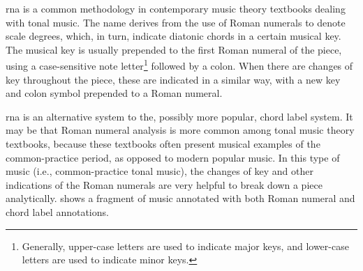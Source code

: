 

\gls{rna} is a common methodology in contemporary music
theory textbooks dealing with tonal music. The name derives
from the use of Roman numerals to denote scale degrees,
which, in turn, indicate diatonic chords in a certain
musical key. The musical key is usually prepended to the
first Roman numeral of the piece, using a case-sensitive
note letter\footnote{Generally, upper-case letters are used
to indicate major keys, and lower-case letters are used to
indicate minor keys.} followed by a colon. When there are
changes of key throughout the piece, these are indicated in
a similar way, with a new key and colon symbol prepended to
a Roman numeral.

\gls{rna} is an alternative system to the, possibly more
popular, chord label system. It may be that Roman numeral
analysis is more common among tonal music theory textbooks,
because these textbooks often present musical examples of
the common-practice period, as opposed to modern popular
music. In this type of music (i.e., common-practice tonal
music), the changes of key and other indications of the
Roman numerals are very helpful to break down a piece
analytically.  shows a fragment of music
annotated with both Roman numeral and chord label
annotations.

